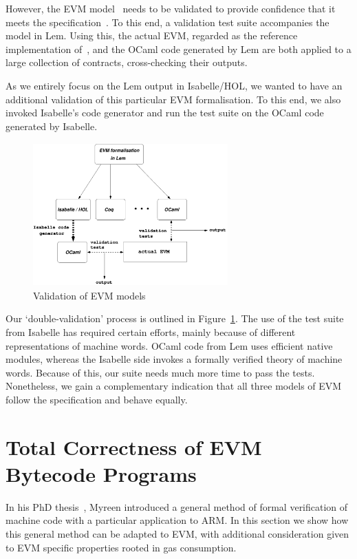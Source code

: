 \documentclass[sigplan,10pt,review]{acmart}\settopmatter{printfolios=true,printccs=false,printacmref=false}
\begin{document}
However, the EVM model~\cite{Yoichi} needs to be validated to provide confidence that it
meets the specification~\cite{wood2014ethereum}. 
To this end, a validation test suite accompanies
the model in Lem. Using this, the actual EVM, regarded as the reference implementation of~\cite{wood2014ethereum}, 
and the OCaml code generated by Lem %
are both applied to a large collection of contracts, cross-checking their outputs.  

As we entirely focus on the Lem output in Isabelle/HOL, we wanted to
have an additional validation of this particular EVM formalisation. 
To this end, we also invoked Isabelle's code generator and run the test suite 
on the OCaml code generated by Isabelle.
\begin{figure}[ht!]
\centering
\includegraphics[height=5.5cm, width=7.5cm]{images/evm_lem}    
        \caption{Validation of EVM models}
\label{fig:valid}
\end{figure}
Our `double-validation' process is outlined in Figure~\ref{fig:valid}.
The use of the test suite from Isabelle has required certain efforts, mainly because 
of different representations of machine words. OCaml code from Lem uses efficient native modules,
whereas the Isabelle side invokes a formally verified theory of machine words.
Because of this, our suite needs much more time to pass the tests.
Nonetheless, we gain a complementary indication that all three models of EVM follow the specification
and behave equally.    
%
\section{Total Correctness of EVM Bytecode Programs}
\label{sec:corr}
In his PhD thesis~\cite{DBLP:phd/ethos/Myreen09}, Myreen introduced a general 
method of formal verification of
machine code with a particular application to ARM. In this section we show how
this general method can be adapted to EVM, with additional consideration given to
EVM specific properties rooted in gas consumption.
 
\end{document}
